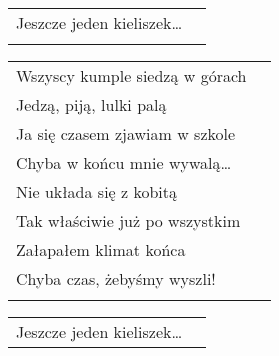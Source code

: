 \documentclass[a5paper]{article}
\begin{document}
\noindent
\begin{tabular}{@{}p{7.00cm}p{3cm}@{}}
Jeszcze jeden kieliszek… \\ \\
\end{tabular}

\noindent
\begin{tabular}{@{}p{7.00cm}p{3cm}@{}}
Wszyscy kumple siedzą w górach \\
Jedzą, piją, lulki palą\\
Ja się czasem zjawiam w szkole\\
Chyba w końcu mnie wywalą…\\
Nie układa się z kobitą\\
Tak właściwie już po wszystkim\\
Załapałem klimat końca\\
Chyba czas, żebyśmy wyszli!\\ \\
\end{tabular}

\noindent
\begin{tabular}{@{}p{7.00cm}p{3cm}@{}}
Jeszcze jeden kieliszek…
\end{tabular}
\end{document}
